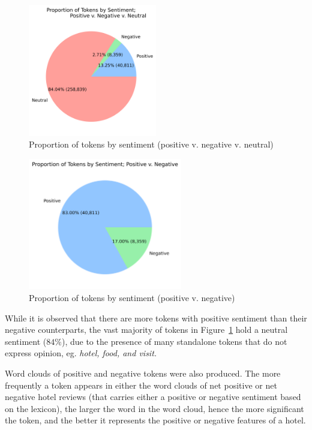 \documentclass[12pt,bibliography=totocnumbered]{scrartcl}
\begin{document}
{\begin{figure}[htpb]
	\begin{center}
		\includegraphics[width=0.5\textwidth]{../results/rq1/pie_tripartite.png}
	\end{center}
	\caption{Proportion of tokens by sentiment (positive v. negative v. neutral)}
	\label{fig:reviews-pie1}
\end{figure}

\begin{figure}[htpb]
	\begin{center}
		\includegraphics[width=0.6\textwidth]{../results/rq1/pie_bipartite.png}
	\end{center}
	\caption{Proportion of tokens by sentiment (positive v. negative)}
	\label{fig:reviews-pie2}
\end{figure}

While it is observed that there are more tokens with positive sentiment than
their negative counterparts, the vast majority of tokens in
Figure~\ref{fig:reviews-pie1} hold a neutral sentiment ($84\%$),
due to the presence of many standalone tokens that do not express opinion,
eg. \it{hotel}, \it{food}, and \it{visit}.

Word clouds of positive and negative tokens were also produced.
The more frequently a token appears in either the word clouds of
net positive or net negative hotel reviews (that carries either a positive
or negative sentiment based on the lexicon), the larger the word in the word cloud,
hence the more significant the token, and the better it represents the positive
or negative features of a hotel.

}
\end{document}
